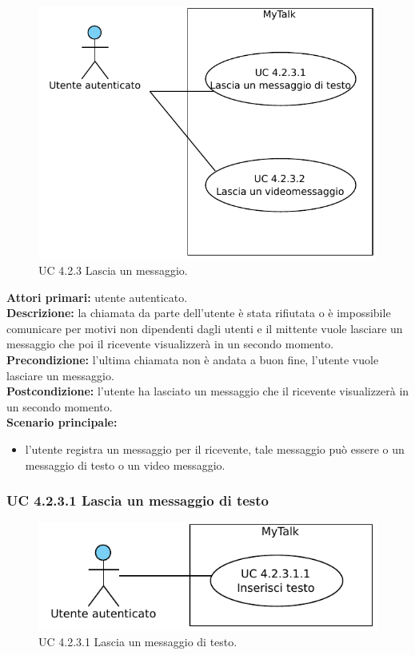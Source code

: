 \begin{figure}[htbp]
\centering
\includegraphics[scale=0.7]{./casi_uso/UC4-2-3.pdf}
\caption{UC 4.2.3 Lascia un messaggio.}
\end{figure}

\noindent
\textbf{Attori primari:} utente autenticato.\\
\textbf{Descrizione:} la chiamata da parte dell'utente è stata rifiutata o è impossibile comunicare per motivi non dipendenti dagli utenti e il mittente vuole lasciare un messaggio che poi il ricevente visualizzerà in un secondo momento.\\
\textbf{Precondizione:} l'ultima chiamata non è andata a buon fine, l'utente vuole lasciare un messaggio.\\
\textbf{Postcondizione:} l'utente ha lasciato un messaggio che il ricevente visualizzerà in un secondo momento.\\
\textbf{Scenario principale:}
\begin{itemize}
\item l'utente registra un messaggio per il ricevente, tale messaggio può essere o un messaggio di testo o un video messaggio.
\end{itemize}

\subsubsection{UC 4.2.3.1 Lascia un messaggio di testo}

\begin{figure}[htbp]
\centering
\includegraphics[scale=0.7]{./casi_uso/UC4-2-3-1.pdf}
\caption{UC 4.2.3.1 Lascia un messaggio di testo.}
\end{figure}

